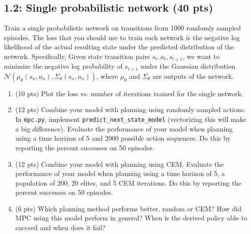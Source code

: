 \documentclass[12pt]{article}
\begin{document}
\subsection*{1.2: Single probabilistic network (40 pts)}
Train a single probabilistic network on transitions from 1000 randomly sampled episodes. The loss that you should use to train each network is the negative log likelihood of the actual resulting state under the predicted distribution of the network. Specifically, Given state transition pairs $s_t, a_t, s_{t+1}$, we want to minimize the negative log probability of $s_{t+1}$ under the Gaussian distribution $\mathcal{N}(\mu_{\theta}(s_n,a_n),\Sigma_{\theta}(s_n,a_n))$, 
    where $\mu_{\theta}$ and $\Sigma_{\theta}$ are outputs of the network. 

\begin{enumerate}
    \item (10 pts) Plot the loss vs. number of iterations trained for the single network.
    
    \item (12 pts) Combine your model with planning using randomly sampled actions. In \texttt{mpc.py}, implement \texttt{predict\_next\_state\_model} (vectorizing this will make a big difference). Evaluate the performance of your model when planning using a time horizon of 5 and 2000 possible action sequences.  Do this by reporting the percent successes on 50 episodes.
    
    \item (12 pts) Combine your model with planning using CEM.  Evaluate the performance of your model when planning using a time horizon of 5, a population of 200, 20 elites, and 5 CEM iterations.  Do this by reporting the percent successes on 50 episodes.
    
    \item (6 pts) Which planning method performs better, random or CEM?  How did MPC using this model perform in general?  When is the derived policy able to succeed and when does it fail?
    
\end{enumerate}
\end{document}
